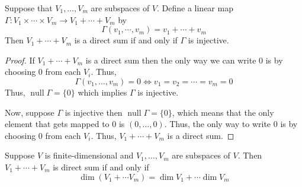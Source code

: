 \begin{proposition}
    Suppose that $V_1, \ldots, V_m$ are subspaces of $V$. Define a linear map $\Gamma : V_1 \times \cdots \times V_m \to V_1 + \cdots + V_m$
    by
    \[ \Gamma(v_1, \cdots, v_m) = v_1 + \cdots + v_m \]
    Then $V_1 + \cdots + V_m$ is a direct sum if and only if  $\Gamma$ is injective.
\end{proposition}

\begin{proof}
    If $V_1 + \cdots + V_m$ is a direct sum then the only way we can write $0$ is by choosing $0$ from each $V_i$. Thus,
    \[ \Gamma(v_1, \ldots, v_m) = 0 \iff v_1 = v_2 = \cdots = v_m = 0 \]
    Thus, $\operatorname{null} \Gamma = \{0\}$ which implies $\Gamma$ is injective.
    
    Now, suppose $\Gamma$ is injective then $\operatorname{null} \Gamma = \{0\}$, which means that the only element that gets mapped to $0$
    is $(0,\ldots,0)$. Thus, the only way to write $0$ is by choosing $0$ from each $V_i$. Thus, $V_1 + \cdots + V_m$ is a direct sum. 
\end{proof}

\begin{proposition}
    Suppose $V$ is finite-dimensional and $V_1, \ldots, V_m$ are subspaces of $V$. Then $V_1 + \cdots + V_m$ is direct sum if and only if
    \[ \dim (V_1 + \cdots V_m) = \dim V_1 + \cdots \dim V_m \]
\end{proposition}